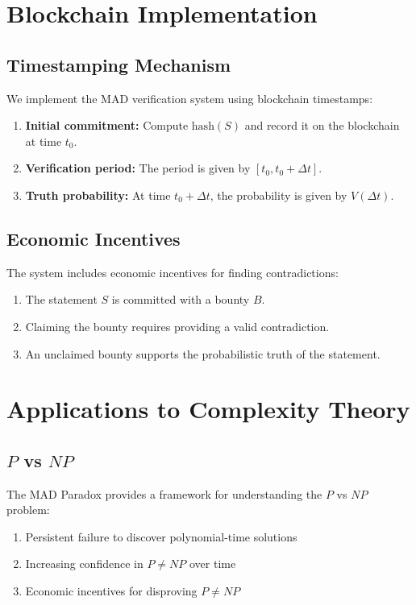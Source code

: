\documentclass[11pt]{article}
\begin{document}
\section{Blockchain Implementation}

\subsection{Timestamping Mechanism}

We implement the MAD verification system using blockchain timestamps:
\begin{enumerate}[label=(\arabic*)]
    \item \textbf{Initial commitment:} Compute $\mathrm{hash}(S)$ and record it on the blockchain at time $t_0$.
    \item \textbf{Verification period:} The period is given by $[t_0, t_0+\Delta t]$.
    \item \textbf{Truth probability:} At time $t_0+\Delta t$, the probability is given by $V(\Delta t)$.
\end{enumerate}

\subsection{Economic Incentives}

The system includes economic incentives for finding contradictions:
\begin{enumerate}[label=(\arabic*)]
    \item The statement $S$ is committed with a bounty $B$.
    \item Claiming the bounty requires providing a valid contradiction.
    \item An unclaimed bounty supports the probabilistic truth of the statement.
\end{enumerate}

\section{Applications to Complexity Theory}

\subsection{$P$ vs $NP$}

The MAD Paradox provides a framework for understanding the $P$ vs $NP$ problem:
\begin{enumerate}[label=(\arabic*)]
    \item Persistent failure to discover polynomial-time solutions
    \item Increasing confidence in $P \neq NP$ over time  
    \item Economic incentives for disproving $P \neq NP$
\end{enumerate}
\end{document}
